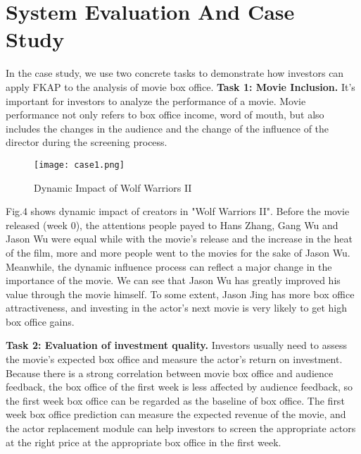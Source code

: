 \section{System Evaluation And Case Study}
\label{sec:evo} 
\par  In the case study, we use two concrete tasks to demonstrate how investors can apply FKAP to the analysis of movie box office.
\textbf{Task 1: Movie Inclusion.} It's important for investors to analyze the performance of a movie. Movie performance not only refers to box office income, word of mouth, but also includes the changes in the audience and the change of the influence of the director during the screening process.

\begin{figure}[!htbp]
\centering
\texttt{[image: case1.png]}
\caption{Dynamic Impact of Wolf Warriors II}
\label{fig:case1}
\end{figure}

\par Fig.4 shows dynamic impact of creators in "Wolf Warriors II". Before the movie released (week 0), the attentions people payed to Hans Zhang, Gang Wu and Jason Wu were equal while with the movie's release and the increase in the heat of the film, more and more people went to the movies for the sake of Jason Wu. Meanwhile, the dynamic influence process can reflect a major change in the importance of the movie. We can see that Jason Wu has greatly improved his value through the movie himself. To some extent, Jason Jing has more box office attractiveness, and investing in the actor's next movie is very likely to get high box office gains.

\textbf{Task 2: Evaluation of investment quality.} Investors usually need to assess the movie's expected box office and measure the actor's return on investment. Because there is a strong correlation between movie box office and audience feedback, the box office of the first week is less affected by audience feedback, so the first week box office can be regarded as the baseline of box office. The first week box office prediction can measure the expected revenue of the movie, and the actor replacement module can help investors to screen the appropriate actors at the right price at the appropriate box office in the first week.
